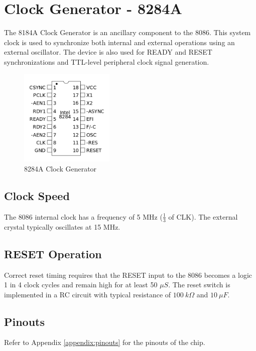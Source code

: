 \section{Clock Generator - 8284A}
The 8184A Clock Generator is an ancillary component to the 8086. This system clock is used to synchronize both internal and external operations using an external oscillator. The device is also used for READY and RESET synchronizations and TTL-level peripheral clock signal generation.

        \begin{figure}[h]
            \begin{center}
                \includegraphics[width=0.4\textwidth]{figures/8284a.png}
                \caption{8284A Clock Generator} \label{fig:8284a}
            \end{center}
        \end{figure}

    \subsection{Clock Speed}
    The 8086 internal clock has a frequency of 5 MHz ($\frac{1}{3}$ of CLK). The external crystal typically oscillates at 15 MHz.

    \subsection{RESET Operation}
    Correct reset timing requires that the RESET input to the 8086 becomes a logic 1 in 4 clock cycles and remain high for at least 50 $\mu S$. The reset switch is implemented in a RC circuit with typical resistance of $100 \ k\Omega$ and $10 \ \mu F$.

    \subsection{Pinouts}
    Refer to Appendix \ref{appendix:pinouts} for the pinouts of the chip.

